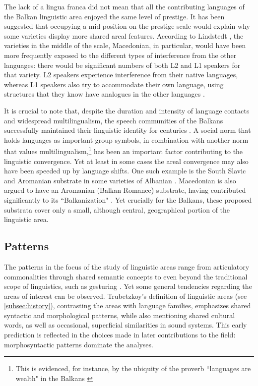 \documentclass[output=paper,
modfonts
]{langscibook}
\begin{document}
The lack of a lingua franca did not mean that all the contributing languages of the Balkan linguistic area enjoyed the same level of prestige. It has been suggested that occupying a mid-position on the prestige scale would explain why some varieties display more shared areal features. According to Lindstedt \parencite*{lindstedt2018}, the varieties in the middle of the scale, Macedonian, in particular, would have been more frequently exposed to the different types of interference from the other languages: there would be significant numbers of both L2 and L1 speakers for that variety. L2 speakers experience interference from their native languages, whereas L1 speakers also try to accommodate their own language, using structures that they know have analogues in the other languages \parencite[see also][624--628]{joseph2010}.

It is crucial to note that, despite the duration and intensity of language contacts and widespread multilingualism, the speech communities of the Balkans successfully maintained their linguistic identity for centuries \parencite[see, e.g.,][625]{joseph2010}. A social norm that holds languages as important group symbols, in combination with another norm that values multilingualism,\footnote{This is evidenced, for instance, by the ubiquity of the proverb ``languages are wealth" in the Balkans \parencite[163]{friedman12}} has been an important factor contributing to the linguistic convergence. Yet at least in some cases the areal convergence may also have been speeded up by language shifts. One such example is the South Slavic and Aromanian substrate in some varieties of Albanian \parencite[258--260]{RefWorks:desnickaja68}. Macedonian is also argued to have an Aromanian (Balkan Romance) substrate, having contributed significantly to its ``Balkanization" \parencite{Golab97}. Yet crucially for the Balkans, these proposed substrata cover only a small, although central, geographical portion of the linguistic area.  


\subsection{Patterns}
\label{sec:patterns}

The patterns in the focus of the study of linguistic areas range from articulatory commonalities through shared semantic concepts to even beyond the traditional scope of linguistics, such as gesturing \parencite[for the latter, see][196]{enfield2005}. Yet some general tendencies regarding the areas of interest can be observed. Trubetzkoy's definition of linguistic areas (see \ref{subsec:history}), contrasting the areas with language families, emphasizes  shared syntactic and morphological patterns, while also mentioning shared cultural words, as well as occasional, superficial similarities in sound systems. This early prediction is reflected in the choices made in later contributions to the field: morphosyntactic patterns dominate the analyses.  
\end{document}
